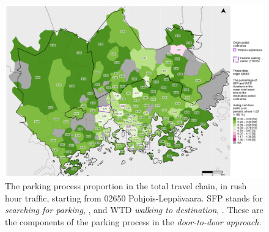 \begin{figure}
    \section{}
    \centering
    \includegraphics[trim={0.9cm 0.3cm 0.25cm 0.3cm},clip,width=\textwidth]{images/compare_traveltimes_mapfill-msc_r_pct_fromzip-02650_16-10-2020.png}
    \caption[Parking process proportion from Pohjois-Leppävaara, rush hour traffic]{The parking process proportion in the total travel chain, in rush hour traffic, starting from 02650 Pohjois-Leppävaara. SFP stands for \textit{searching for parking}, , and WTD \textit{walking to destination}, . These are the components of the parking process in the \textit{door-to-door approach}.}%
    \label{fig:compare_msc_r_pct_02650}%
\end{figure}


